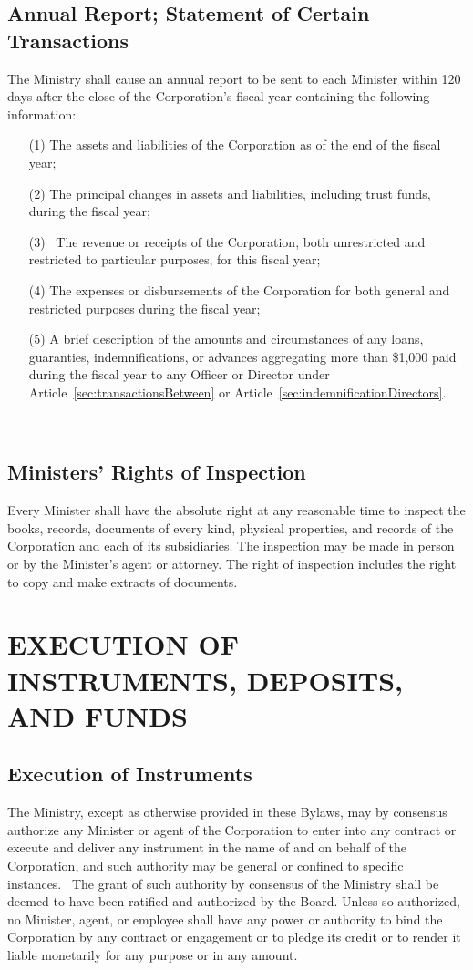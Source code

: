 \documentclass[letterpaper,titlepage]{article}
\begin{document}
\subsection{Annual Report; Statement of Certain Transactions}
\label{sec:annualReport}
The Ministry shall cause an annual report to be sent to each Minister within 120 days after the close of the Corporation’s fiscal year containing the following information: 
\begin{itemize}
    \item[(1)] The assets and liabilities of the Corporation as of the end of the fiscal year;
    \item[(2)] The principal changes in assets and liabilities, including trust funds, during the fiscal year;
    \item[(3)] The revenue or receipts of the Corporation, both unrestricted and restricted to particular purposes, for this fiscal year;
    \item[(4)] The expenses or disbursements of the Corporation for both general and restricted purposes during the fiscal year;
    \item[(5)] A brief description of the amounts and circumstances of any
        loans, guaranties, indemnifications, or advances aggregating more than
        \$1,000 paid during the fiscal year to any Officer or Director under
        Article~\ref{sec:transactionsBetween} or Article~\ref{sec:indemnificationDirectors}.
\end{itemize} 
\subsection{Ministers' Rights of Inspection}
\label{sec:minstersRights}
Every Minister shall have the absolute right at any reasonable time to inspect the books, records, documents of every kind, physical properties, and records of the Corporation and each of its subsidiaries. The inspection may be made in person or by the Minister’s agent or attorney. The right of inspection includes the right to copy and make extracts of documents.
\section{EXECUTION OF INSTRUMENTS, DEPOSITS, AND FUNDS}
\label{sec:instrumentsDepositsFunds}
\subsection{Execution of Instruments}
\label{sec:executionInstruments}
The Ministry, except as otherwise provided in these Bylaws, may by consensus authorize any Minister or agent of the Corporation to enter into any contract or execute and deliver any instrument in the name of and on behalf of the Corporation, and such authority may be general or confined to specific instances.  The grant of such authority by consensus of the Ministry shall be deemed to have been ratified and authorized by the Board.  Unless so authorized, no Minister, agent, or employee shall have any power or authority to bind the Corporation by any contract or engagement or to pledge its credit or to render it liable monetarily for any purpose or in any amount.
\end{document}
